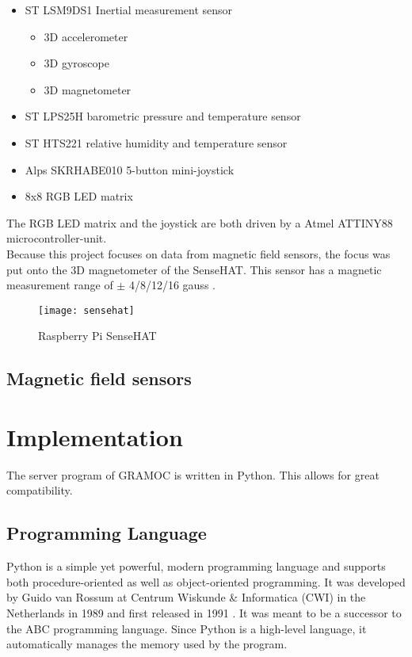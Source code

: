 \begin{itemize}
	\item ST LSM9DS1 Inertial measurement sensor
		\begin{itemize}
			\item 3D accelerometer
			\item 3D gyroscope
			\item 3D magnetometer
		\end{itemize}
	\item ST LPS25H barometric pressure and temperature sensor
	\item ST HTS221 relative humidity and temperature sensor
	\item Alps SKRHABE010 5-button mini-joystick
	\item 8x8 RGB LED matrix
\end{itemize}
\bigskip
The RGB LED matrix and the joystick are both driven by a Atmel ATTINY88 microcontroller-unit.\\
Because this project focuses on data from magnetic field sensors, the focus was put onto the 3D magnetometer of the SenseHAT. This sensor has a magnetic measurement range of $\pm$ 4/8/12/16 gauss \cite{InertialSensorsManual}.

\begin{figure}[H]
	\centering
	\texttt{[image: sensehat]}
	\caption{Raspberry Pi SenseHAT}
	\label{fig:raspberrypi3b}
\end{figure}

\subsection{Magnetic field sensors}


\section{Implementation}

The server program of GRAMOC is written in Python. This allows for great compatibility.

\subsection{Programming Language}

Python is a simple yet powerful, modern programming language and supports both procedure-oriented as well as object-oriented programming. It was developed by Guido van Rossum at Centrum Wiskunde \& Informatica (CWI) in the Netherlands in 1989 and first released in 1991 \cite{HistoryOfPython}. It was meant to be a successor to the ABC programming language. Since Python is a high-level language, it automatically manages the memory used by the program.

